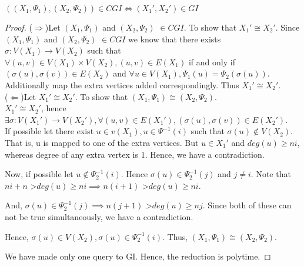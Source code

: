 \begin{claim}
$((X_1,\Psi_1),(X_2,\Psi_2))\in CGI \iff (X_1',X_2')\in GI$
\end{claim}
\begin{proof}
($\Rightarrow$)Let $(X_1,\Psi_1)$ and $(X_2,\Psi_2)$ $\in CGI$. To show that $X_1' \cong X_2'$. Since  $(X_1,\Psi_1)$ and $(X_2,\Psi_2)$ $\in CGI$ we know that there exists $\sigma : V(X_1) \rightarrow V(X_2)$ such that $\forall (u,v) \in V(X_1)\times V(X_2), (u,v) \in E(X_1)$ if and only if $(\sigma(u), \sigma(v)) \in E(X_2) $ and $\forall u \in V(X_1) , \Psi_1(u) = \Psi_2(\sigma(u))$. Additionally map the extra vertices added correspondingly. Thus $X_1' \cong X_2'$.\\
($\Leftarrow$)Let $X_1' \cong X_2'$. To show that $(X_1,\Psi_1) \cong (X_2,\Psi_2)$.\\
$X_1' \cong X_2'$, hence $ \exists \sigma : V(X_1') \rightarrow V(X_2'), \forall (u,v) \in E(X_1'), (\sigma(u),\sigma(v)) \in E(X_2')$.\\
If possible let there exist $ u \in v(X_1), u \in \Psi^{-1}(i)$ such that $\sigma(u) \notin V(X_2)$. That is, u is mapped to one of the extra vertices. But $u \in X_1'$ and $deg(u) \ge ni$, whereas degree of any extra vertex is 1. Hence, we have a contradiction.

Now, if possible let $u \notin \Psi_2^{-1}(i)$. Hence $\sigma(u) \in \Psi_2^{-1}(j)$ and $j \neq i$. Note that $ni + n$ \textgreater $deg(u) \ge ni \implies n(i+1)$ \textgreater $deg(u) \ge ni$.

And, $\sigma(u) \in \Psi_2^{-1}(j) \implies n(j+1)$ \textgreater $deg(u) \ge nj$. Since both of these can not be true simultaneously, we have a contradiction.

Hence, $\sigma(u) \in V(X_2) , \sigma(u) \in \Psi_2^{-1}(i)$. Thus, $(X_1,\Psi_1) \cong (X_2,\Psi_2)$.

We have made only one query to GI. Hence, the reduction is polytime.
\end{proof}




